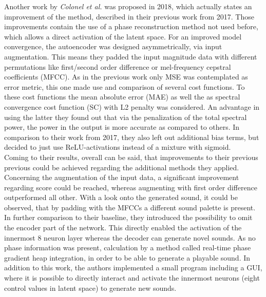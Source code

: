 Another work by \textit{Colonel et al.} was proposed in 2018, which actually states an improvement of the method, described in their previous work from 2017. \cite{colonel2018autoencoding} Those improvements contain the use of a phase reconstruction method not used before, which allows a direct activation of the latent space. For an improved model convergence, the autoencoder was designed asymmetrically, via input augmentation. This means they padded the input magnitude data with different permutations like first/second order difference or mel-frequency cepstral coefficients (MFCC). As in the previous work only MSE was contemplated as error metric, this one made use and comparison of several cost functions. To these cost functions the mean absolute error (MAE) as well the as spectral convergence cost function (SC) with L2 penalty was considered. An advantage in using the latter they found out that via the penalization of the total spectral power, the power in the output is more accurate as compared to others. In comparison to their work from 2017, they also left out additional bias terms, but decided to just use ReLU-activations instead of a mixture with sigmoid.\\
Coming to their results, overall can be said, that improvements to their previous previous could be achieved regarding the additional methods they applied. Concerning the augmentation of the input data, a significant improvement regarding score could be reached, whereas augmenting with first order difference outperformed all other. With a look onto the generated sound, it could be observed, that by padding with the MFCCs a different sound palette is present. In further comparison to their baseline, they introduced the possibility to omit the encoder part of the network. This directly enabled the activation of the innermost 8 neuron layer whereas the decoder can generate novel sounds. As no phase information was present, calculation by a method called real-time phase gradient heap integration, in order to be able to generate a playable sound. In addition to this work, the authors implemented a small program including a GUI, where it is possible to directly interact and activate the innermost neurons (eight control values in latent space) to generate new sounds.\\

